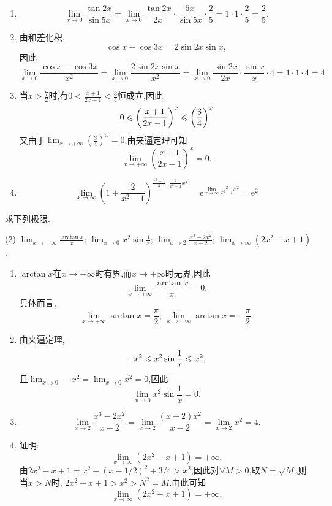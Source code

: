 \begin{solution}
    \begin{enumerate}[(1)]
        \item $$\lim_{x \to 0} \frac{\tan 2x}{\sin 5x} = \lim_{x \to 0} \frac{\tan 2x}{2x} \cdot \frac{5x}{\sin 5x} \cdot \frac{2}{5} = 1 \cdot 1 \cdot \frac{2}{5} = \frac{2}{5}.$$
        \item 由和差化积, $$ \cos x - \cos 3x = 2 \sin 2x \sin x, $$因此$$\lim_{x \to 0} \frac{\cos x - \cos 3x}{x^2} = \lim_{x \to 0} \frac{2 \sin 2x \sin x}{x^2} = \lim_{x \to 0} \frac{\sin 2x}{2x} \cdot \frac{\sin x}{x} \cdot 4 = 1 \cdot 1 \cdot 4 = 4.$$
        \item 当$x>\frac{7}{2}$时,有$0<\frac{x+1}{2x-1}<\frac{3}{4}$恒成立,因此$$0\leqslant\left(\frac{x+1}{2x-1}\right)^x\leqslant\left(\frac{3}{4}\right)^x$$
        又由于$\lim_{x \to +\infty} \left(\frac{3}{4}\right)^x = 0$,由夹逼定理可知$$\lim_{x \to +\infty} \left(\frac{x+1}{2x-1}\right)^x = 0.$$
        \item $$
                  \lim_{x \to \infty} \left(1 + \frac{2}{x^2 - 1}\right)^{\frac{x^2 - 1}{2} \cdot \frac{2}{x^2 - 1} x^2} = \mathrm{e}^{\lim_{x \to \infty} \frac{2}{x^2 - 1} x^2} = \mathrm{e}^2
              $$
    \end{enumerate}
\end{solution}

\begin{exercise}[1.3.10]
    求下列极限.
    \begin{tasks}[label=(\arabic*)](2)
        \task $\lim_{x \to +\infty} \frac{\arctan x}{x}$;
        \task $\lim_{x \to 0} x^2 \sin\frac{1}{x}$;
        \task $\lim_{x \to 2} \frac{x^3-2x^2}{x-2}$;
        \task $\lim_{x \to \infty} (2x^2 - x + 1)$.
    \end{tasks}
\end{exercise}

\begin{solution}
    \begin{enumerate}[(1)]
        \item $\arctan x$在$x \to +\infty$时有界,而$x \to +\infty$时无界,因此$$\lim_{x \to +\infty} \frac{\arctan x}{x} = 0.$$具体而言, $$\lim_{x \to + \infty} \arctan x = \frac{\pi}{2} , \ \lim_{x \to -\infty} \arctan x = -\frac{\pi}{2}.$$
        \item 由夹逼定理, $$-x^2 \leqslant x^2 \sin \frac{1}{x} \leqslant x^2, $$且$\lim_{x \to 0} -x^2 = \lim_{x \to 0} x^2 = 0$,因此$$\lim_{x \to 0} x^2 \sin\frac{1}{x} = 0.$$
        \item $$\lim_{x \to 2} \frac{x^3-2x^2}{x-2} = \lim_{x \to 2} \frac{(x-2)x^2}{x-2} = \lim_{x \to 2}x^2  = 4.$$
        \item 证明: $$\lim_{x \to \infty} (2x^2 - x + 1) = +\infty.$$
              由$2x^2 - x + 1 = x^2 + (x - 1/2)^2 + 3/4 > x^2$,因此对$\forall M > 0$,取$N = \sqrt{M}$,则当$x > N$时, $2x^2 - x + 1 > x^2 > N^2 = M$.由此可知$$\lim_{x \to \infty} (2x^2 - x + 1) = +\infty.$$
    \end{enumerate}
\end{solution}


